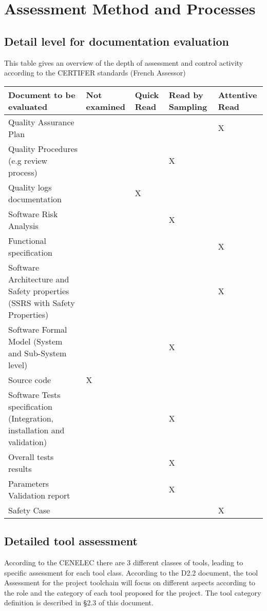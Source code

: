 \documentclass{template/openetcs_article}
\begin{document}
\newpage
\section{Assessment Method and Processes}

\subsection{Detail level for documentation evaluation}

This table gives an overview of the depth of assessment and control activity according to the CERTIFER standards (French Assessor)

\begin{tabular}{p{5cm}|>{\centering\arraybackslash}p{2cm}|>{\centering\arraybackslash}p{2cm}|
	>{\centering\arraybackslash}p{2cm}|>{\centering\arraybackslash}p{2cm}|} 
\hline
\textbf{Document to be evaluated} & \textbf{Not examined} & \textbf{Quick Read} & \textbf{Read by Sampling} & \textbf{Attentive Read} \\ \hline
Quality Assurance Plan & & & & X \\ \hline
Quality Procedures (e.g review process) & & & X & \\ \hline
Quality logs documentation & & X & & \\ \hline
Software Risk Analysis & & & X & \\ \hline
Functional specification & & & & X \\ \hline
Software Architecture and Safety properties (SSRS with Safety Properties) & & & & X \\ \hline
Software Formal Model (System and Sub-System level) & & & X & \\ \hline
Source code & X & & & \\ \hline
Software Tests specification (Integration, installation and validation) & & & X & \\ \hline
Overall tests results & & & X & \\ \hline
Parameters Validation report & & & X & \\ \hline
Safety Case & & & & X \\ \hline
\end{tabular}

\subsection{Detailed tool assessment}
According to the CENELEC there are 3 different classes of tools, leading to specific assessment for each tool class. According to the D2.2 document, the tool
Assessment for the project toolchain will focus on different aspects according to the role and the category of each tool proposed for the project. The tool
category definition is described in \S 2.3 of this document.
\end{document}
